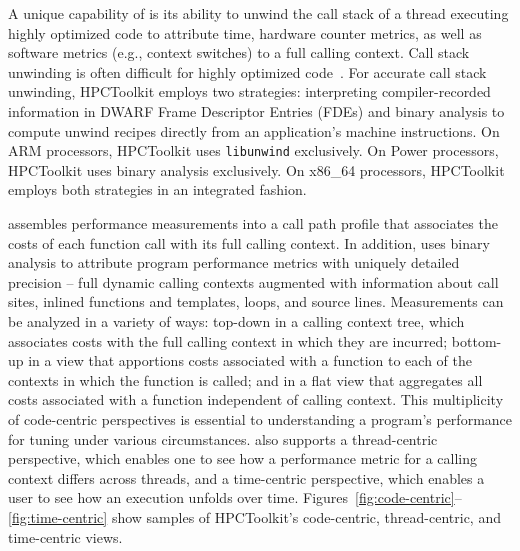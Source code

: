 \documentclass[11pt,letterpaper]{report}
\begin{document}
A unique capability of \HPCToolkit{} is its ability to unwind the call stack of a thread executing highly optimized code to attribute time, hardware counter metrics, as well as software metrics (e.g., context switches) to a full calling context.
Call stack unwinding is often difficult for highly optimized code~\cite{Tallent-MC-Fagan:2009:PLDI-hpctoolkit-binary-analysis}. For accurate call stack unwinding, HPCToolkit employs two strategies: 
interpreting compiler-recorded information in DWARF Frame Descriptor Entries (FDEs) and binary analysis 
to compute unwind recipes directly from an application's  machine instructions.  
On ARM processors, HPCToolkit uses {\tt libunwind} exclusively. On Power processors, HPCToolkit uses
binary analysis exclusively. 
On x86\_64 processors, HPCToolkit employs both strategies in an integrated fashion.

\HPCToolkit{} assembles performance measurements into a call path profile that associates the costs of each function call with its full calling context.
In addition, \HPCToolkit{} uses binary analysis to attribute program performance metrics with uniquely detailed precision -- full dynamic calling contexts augmented with information about call sites, inlined functions and templates, loops, and source lines.
Measurements can be analyzed in a variety of ways: top-down in a calling context tree, which associates costs with the full calling context in which they are incurred; bottom-up in a view that apportions costs associated with a function to each of the contexts in which the function is called; and in a flat view that aggregates all costs associated with a function independent of calling context.
This multiplicity of code-centric perspectives is essential to understanding a program's performance for tuning under various circumstances. 
\HPCToolkit{} also supports a thread-centric perspective, which enables one to see how a performance metric for a calling context differs across threads, and a time-centric perspective, which enables a user to see how an execution unfolds over time. Figures~\ref{fig:code-centric}--\ref{fig:time-centric} show samples of HPCToolkit's code-centric, thread-centric, and time-centric views.
\end{document}
